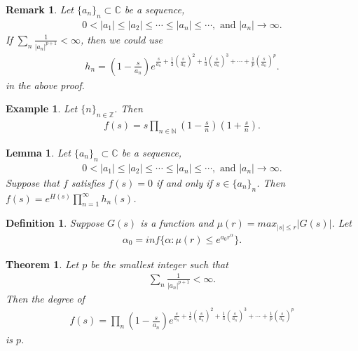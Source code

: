 \documentclass[a4paper,10pt]{amsart}
\newtheorem{example}{Example}[section]
\newtheorem{theorem}{Theorem}[section]
\newtheorem{definition}{Definition}[section]
\newtheorem{lemma}{Lemma}[section]
\newtheorem{remark}{Remark}[section]
\newcommand{\C}{\mathbb C} %
\newcommand{\Z}{\mathbb Z} %
\newcommand{\N}{\mathbb N} %
\begin{document}
\begin{remark}
Let $\{a_{n}\}_{n} \subset \C$ be a sequence, 
\begin{align*}
    0 < |a_{1}| \leq |a_{2}| \leq \cdots \leq |a_{n}| \leq \cdots,
    \mbox{ and } |a_{n}| \rightarrow \infty.
\end{align*}
If $\sum_{n}\frac{1}{|a_{n}|^{p+1}} < \infty$, then we could 
use
\begin{align*}
       h_{n} = (1 - \frac{s}{a_n})e^{\frac{s}{a_{n}}
           +\frac{1}{2}(\frac{s}{a_{n}})^{2} 
            +\frac{1}{3}(\frac{s}{a_{n}})^{3} + \cdots
        +\frac{1}{p}(\frac{s}{a_{n}})^{p}}.
   \end{align*}
in the above proof.
\end{remark}

\begin{example}
    Let $\{n\}_{n \in \Z}$. Then
    \begin{align*}
        f(s) = s\prod_{n \in \N}(1-\frac{s}{n})(1+\frac{s}{n}).  
    \end{align*}
\end{example}

\begin{lemma}
Let $\{a_{n}\}_{n} \subset \C$ be a sequence, 
\begin{align*}
    0 < |a_{1}| \leq |a_{2}| \leq \cdots \leq |a_{n}| \leq \cdots,
    \mbox{ and } |a_{n}| \rightarrow \infty.
\end{align*}
Suppose that $f$ satisfies $f(s) = 0$ if and only if $s \in \{a_{n}\}_n$.
Then
$f(s) = e^{H(s)}\prod_{n=1}^{\infty}h_{n}(s)$.
\end{lemma}

\begin{definition}
    Suppose $G(s)$ is a function and $\mu(r) = max_{|s| \leq r}|G(s)|$.
    Let 
    \begin{align*}
        \alpha_{0} = inf\{\alpha : \mu(r) \leq e^{a_{0}r^{\alpha}}\}. 
    \end{align*}
\end{definition}

\begin{theorem}
   Let $p$ be the smallest integer such that
   \begin{align*}
       \sum_{n} \frac{1}{|a_{n}|^{p+1}} < \infty. 
   \end{align*}
   Then the degree of
\begin{align*}
        f(s) = \prod_{n}(1-\frac{s}{a_{n}}) 
        e^{\frac{s}{a_{n}}
           +\frac{1}{2}(\frac{s}{a_{n}})^{2} 
            +\frac{1}{3}(\frac{s}{a_{n}})^{3} + \cdots
        +\frac{1}{p}(\frac{s}{a_{n}})^{p}}
    \end{align*}
      is $p$.
\end{theorem}
\end{document}
